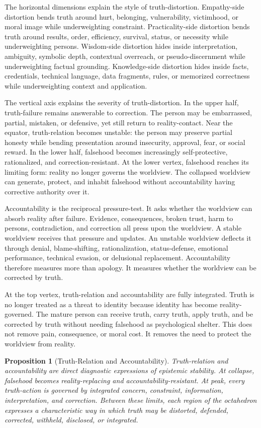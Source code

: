 \documentclass[11pt]{article}
\newtheorem{proposition}{Proposition}
\begin{document}
The horizontal dimensions explain the style of truth-distortion. Empathy-side distortion bends truth around hurt, belonging, vulnerability, victimhood, or moral image while underweighting constraint. Practicality-side distortion bends truth around results, order, efficiency, survival, status, or necessity while underweighting persons. Wisdom-side distortion hides inside interpretation, ambiguity, symbolic depth, contextual overreach, or pseudo-discernment while underweighting factual grounding. Knowledge-side distortion hides inside facts, credentials, technical language, data fragments, rules, or memorized correctness while underweighting context and application.

The vertical axis explains the severity of truth-distortion. In the upper half, truth-failure remains answerable to correction. The person may be embarrassed, partial, mistaken, or defensive, yet still return to reality-contact. Near the equator, truth-relation becomes unstable: the person may preserve partial honesty while bending presentation around insecurity, approval, fear, or social reward. In the lower half, falsehood becomes increasingly self-protective, rationalized, and correction-resistant. At the lower vertex, falsehood reaches its limiting form: reality no longer governs the worldview. The collapsed worldview can generate, protect, and inhabit falsehood without accountability having corrective authority over it.

Accountability is the reciprocal pressure-test. It asks whether the worldview can absorb reality after failure. Evidence, consequences, broken trust, harm to persons, contradiction, and correction all press upon the worldview. A stable worldview receives that pressure and updates. An unstable worldview deflects it through denial, blame-shifting, rationalization, status-defense, emotional performance, technical evasion, or delusional replacement. Accountability therefore measures more than apology. It measures whether the worldview can be corrected by truth.

At the top vertex, truth-relation and accountability are fully integrated. Truth is no longer treated as a threat to identity because identity has become reality-governed. The mature person can receive truth, carry truth, apply truth, and be corrected by truth without needing falsehood as psychological shelter. This does not remove pain, consequence, or moral cost. It removes the need to protect the worldview from reality.

\begin{proposition}[Truth-Relation and Accountability]
Truth-relation and accountability are direct diagnostic expressions of epistemic stability. At collapse, falsehood becomes reality-replacing and accountability-resistant. At peak, every truth-action is governed by integrated concern, constraint, information, interpretation, and correction. Between these limits, each region of the octahedron expresses a characteristic way in which truth may be distorted, defended, corrected, withheld, disclosed, or integrated.
\end{proposition}
\end{document}
